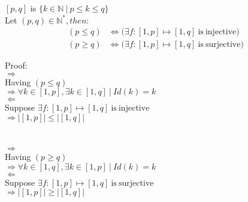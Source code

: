 \documentclass{article}
\begin{document}
\noindent $[p, q] $ is $ \{ k \in \mathbb{N} \ | \ p\leq k\leq q  \} $\\

\noindent Let  $(p, q) \in \mathbb{N^*}, then:$
\begin{align}
(p \leq q) &\iff (\exists f: [1, p] \mapsto [1, q] \mathrm{\ is\  injective)}\\
(p \geq q) &\iff (\exists f: [1, p] \mapsto [1, q] \mathrm{\ is\  surjective)}
\end{align}

\noindent Proof:\\
$\Rightarrow$\\
Having $(p \leq q)$\\
$\Rightarrow \forall k \in [1, p], \exists k \in [1, q]\  | \ Id(k) = k $\\

\noindent $\Leftarrow$\\
Suppose $\exists f: [1, p] \mapsto [1, q] \mathrm{\ is\  injective}$\\
$\Rightarrow |[1, p]| \leq |[1, q]|$\\
\\\\
$\Rightarrow$\\
\noindent Having $(p \geq q)$\\
$\Rightarrow \forall k \in [1, q], \exists k \in [1, p]\  | \ Id(k) = k $\\
\noindent $\Leftarrow$\\
Suppose $\exists f: [1, p] \mapsto [1, q] \mathrm{\ is\  surjective}$\\
$\Rightarrow |[1, p]| \geq |[1, q]|$\\
\end{document}
